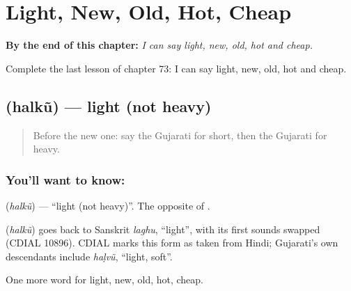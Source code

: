 
\chapter{Light, New, Old, Hot, Cheap}
\label{ch:gu-light-new-old-hot-cheap}

\begin{chapteropening}
\textbf{By the end of this chapter:} \emph{I can say light, new, old, hot and cheap.}

Complete the last lesson of chapter 73: I can say light, new, old, hot and cheap.
\end{chapteropening}

\section[\texorpdfstring{\gu{હલકું} (halkũ)}{હલકું (halkũ)}]{ (halkũ) — light (not heavy)}

\label{lesson:GU-C73-light}



\begin{quote}
Before the new one: say the Gujarati for short, then the Gujarati for heavy.
\end{quote}

\subsection*{You'll want to know: }
\textbf{} (\emph{halkũ}) — \textquotedblleft{}light (not heavy)\textquotedblright{}. The opposite of \textbf{}.

\begin{cousinweb}
\textbf{} (\emph{halkũ}) goes back to Sanskrit \emph{laghu}, \textquotedblleft{}light\textquotedblright{}, with its first sounds swapped (CDIAL 10896). CDIAL marks this form as taken from Hindi; Gujarati's own descendants include \emph{haḷvũ}, \textquotedblleft{}light, soft\textquotedblright{}.
\end{cousinweb}

\begin{grammarlens}[title={What you've built}]
One more word for light, new, old, hot, cheap.
\end{grammarlens}

